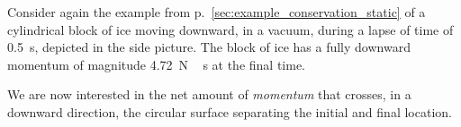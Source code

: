 \documentclass[a4paper,12pt,%
onecolumn,oneside,titlepage,%
british%
]{memoir}
\renewcommand*{\|}[1][]{\nonscript\:#1\vert\nonscript\:\mathopen{}}
\begin{document}
Consider again the example from p.~\ref{sec:example_conservation_static} of a cylindrical block of ice moving downward, in a vacuum, during a lapse of time of \qty{0.5}{s}, depicted in the side picture.
%
The block of ice has a fully downward momentum of magnitude \qty{4.72}{N\,s} at the final time. %

We are now interested in the net amount of \emph{momentum} that crosses, in a downward direction, the circular surface separating the initial and final location.
\end{document}
